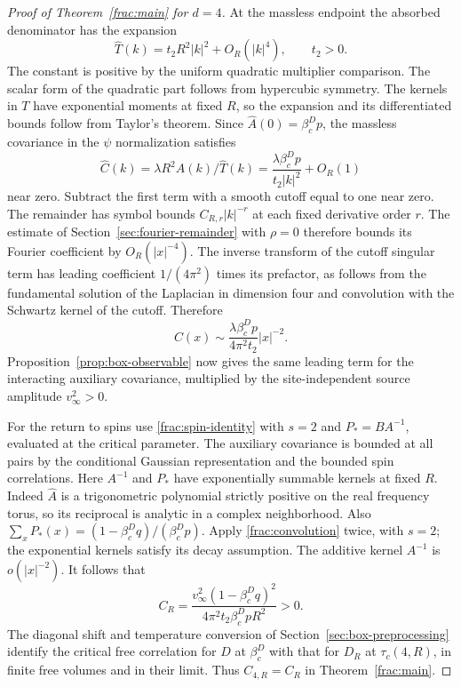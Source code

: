 \documentclass[11pt]{article}
\begin{document}
\begin{proof}[Proof of Theorem~\ref{frac:main} for \(d=4\)]
At the massless endpoint the absorbed denominator has the
expansion
\[
 \widehat T(k)=t_2 R^2|k|^2+O_R(|k|^4),\qquad t_2>0.
\]
The constant is positive by the uniform quadratic multiplier
comparison. The scalar form of the quadratic part follows from
hypercubic symmetry. The kernels in \(T\) have exponential
moments at fixed \(R\), so the expansion and its differentiated
bounds follow from Taylor's theorem. Since \(\widehat A(0)=\beta_c^D p\),
the massless covariance in the \(\psi\) normalization satisfies
\[
 \widehat C(k)=\lambda R^2\widehat A(k)/\widehat T(k)
       =\frac{\lambda\beta_c^D p}{t_2|k|^2}+O_R(1)
\]
near zero. Subtract the first term with a smooth cutoff
equal to one near zero. The remainder has symbol bounds
\(C_{R,r}|k|^{-r}\) at each fixed derivative order \(r\).
The estimate of Section~\ref{sec:fourier-remainder} with \(\rho=0\)
therefore bounds its Fourier coefficient by \(O_R(|x|^{-4})\).
The inverse transform of the cutoff singular term
has leading coefficient \(1/(4\pi^2)\) times its prefactor,
as follows from the fundamental solution of the Laplacian
in dimension four and convolution with the Schwartz kernel
of the cutoff. Therefore
\[
 C(x)\sim \frac{\lambda\beta_c^D p}{4\pi^2 t_2}|x|^{-2}.
\]
Proposition~\ref{prop:box-observable} now gives the same
leading term for the interacting auxiliary covariance, multiplied
by the site-independent source amplitude \(v_\infty^2>0\).

For the return to spins use \eqref{frac:spin-identity} with
\(s=2\) and \(P_*=BA^{-1}\), evaluated at the critical parameter.
The auxiliary covariance is bounded at all pairs by the conditional
Gaussian representation and the bounded spin correlations.
Here \(A^{-1}\) and \(P_*\) have exponentially summable kernels
at fixed \(R\). Indeed \(\widehat A\) is a trigonometric polynomial
strictly positive on the real frequency torus, so its reciprocal
is analytic in a complex neighborhood. Also
\(\sum_xP_*(x)=(1-\beta_c^D q)/(\beta_c^D p)\).
Apply \eqref{frac:convolution} twice, with \(s=2\); the
exponential kernels satisfy its decay assumption. The additive
kernel \(A^{-1}\) is \(o(|x|^{-2})\).
It follows that
\[
 C_R=\frac{v_\infty^2(1-\beta_c^D q)^2}
             {4\pi^2 t_2\beta_c^D p R^2}>0 .
\]
The diagonal shift and temperature conversion of
Section~\ref{sec:box-preprocessing} identify the critical free
correlation for \(D\) at \(\beta_c^D\) with that for \(D_R\)
at \(\tau_c(4,R)\), in finite free volumes and in their limit.
Thus \(C_{4,R}=C_R\) in Theorem~\ref{frac:main}.
\end{proof}
\end{document}
